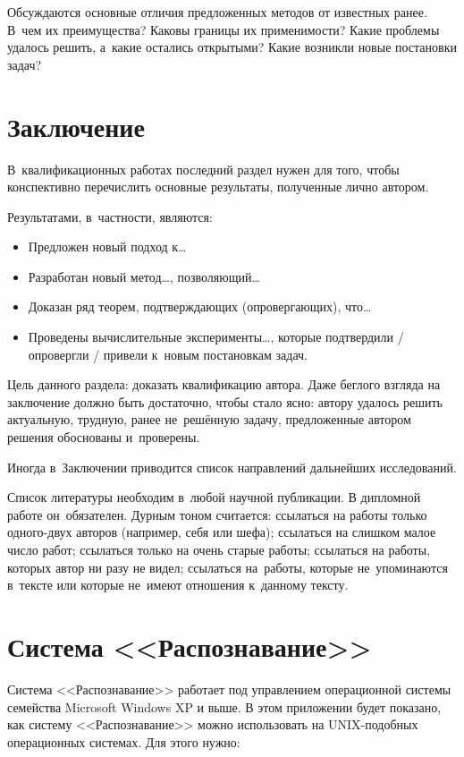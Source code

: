 \documentclass[12pt]{article}
\begin{document}
Обсуждаются основные отличия предложенных методов от известных ранее.
В~чем их преимущества?  Каковы границы их применимости?  Какие
проблемы удалось решить, а~какие остались открытыми?  Какие возникли
новые постановки задач?

\section{Заключение}

В~квалификационных работах последний раздел нужен для того, чтобы
конспективно перечислить основные результаты, полученные лично
автором.

Результатами, в~частности, являются:
\begin{itemize}
\item
    Предложен новый подход к\dots
\item
    Разработан новый метод\dots, позволяющий\dots
\item
    Доказан ряд теорем, подтверждающих (опровергающих), что\dots
\item
    Проведены вычислительные эксперименты\dots, которые подтвердили /
    опровергли / привели к~новым постановкам задач.
\end{itemize}

Цель данного раздела: доказать квалификацию автора.  Даже беглого
взгляда на заключение должно быть достаточно, чтобы стало ясно: автору
удалось решить актуальную, трудную, ранее не~решённую задачу,
предложенные автором решения обоснованы и~проверены.

Иногда в~Заключении приводится список направлений дальнейших
исследований.

\newpage
Список литературы необходим в~любой научной публикации. В дипломной
работе он~обязателен. Дурным тоном считается: ссылаться на работы
только одного-двух авторов (например, себя или шефа); ссылаться на
слишком малое число работ; ссылаться только на очень старые работы;
ссылаться на работы, которых автор ни разу не видел; ссылаться
на~работы, которые не~упоминаются в~тексте или которые не~имеют
отношения к~данному тексту.

\appendix
\section{Система <<Распознавание>>}
Система <<Распознавание>> работает под управлением операционной
системы семейства Microsoft Windows XP и выше. В этом приложении будет
показано, как систему <<Распознавание>> можно использовать на
UNIX-подобных операционных системах. Для этого нужно:
\end{document}
